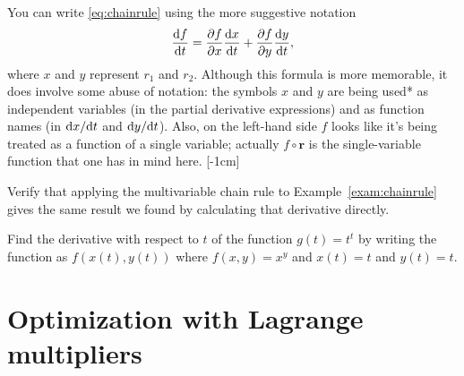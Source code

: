 \documentclass[svgnames]{watsonbook}
\begin{document}
  You can write \eqref{eq:chainrule} using the more suggestive
  notation
  \[
    \frac{\mathrm{d} f}{\mathrm{d} t} = \frac{\partial f}{\partial x}\frac{\mathrm{d} x}{\mathrm{d} t} +
    \frac{\partial f}{\partial y}\frac{\mathrm{d} y}{\mathrm{d} t}, 
  \]
  where $x$ and $y$ represent $r_1$ and $r_2$. Although this formula
  is more memorable, it does involve some abuse of notation: the
  symbols $x$ and $y$ are being used* as independent variables (in the
  partial derivative expressions) and as function names (in $\mathrm{d} x/\mathrm{d} t$
  and $\mathrm{d} y/\mathrm{d} t$). Also, on the left-hand side $f$ looks like it's being
  treated as a function of a single variable; actually
  $f\circ \mathbf{r}$ is the single-variable function that one has in mind here.
  [-1cm]

  \begin{exercise}{}{}
    Verify that applying the multivariable chain rule to
    Example~\ref{exam:chainrule} gives the same result we found by calculating that
    derivative directly. 
  \end{exercise}

  \begin{exercise}{}{}
    Find the derivative with respect to $t$ of the function
    $g(t) = t^t$ by writing the function as $f(x(t),y(t))$ where
    $f(x,y) = x^y$ and $x(t) = t$ and $y(t)=t$.
  \end{exercise}

  
  \section{Optimization with Lagrange multipliers} \label{sec:lagrange} 
\end{document}
